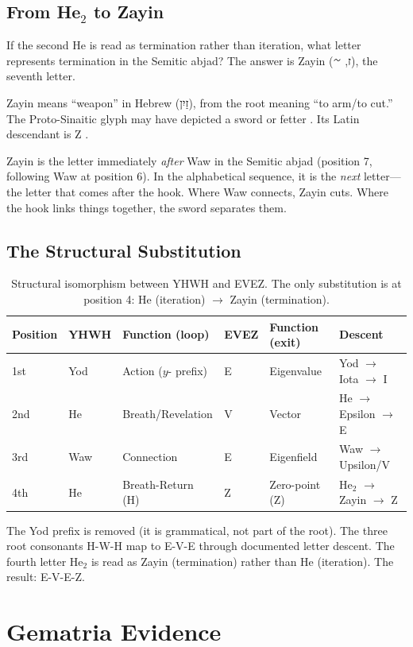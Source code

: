 \documentclass[12pt]{article}
\begin{document}
\subsection{From He$_2$ to Zayin}

If the second He is read as termination rather than iteration, what letter represents termination in the Semitic abjad? The answer is Zayin (ז, 𐤆), the seventh letter.

Zayin means ``weapon'' in Hebrew (זַיִן), from the root meaning ``to arm/to cut.'' The Proto-Sinaitic glyph may have depicted a sword or fetter \cite{cross1980}. Its Latin descendant is Z \cite{jeffery1990}.

Zayin is the letter immediately \textit{after} Waw in the Semitic abjad (position 7, following Waw at position 6). In the alphabetical sequence, it is the \textit{next} letter---the letter that comes after the hook. Where Waw connects, Zayin cuts. Where the hook links things together, the sword separates them.

\subsection{The Structural Substitution}

\begin{table}[h]
\centering
\begin{tabular}{llllll}
\toprule
Position & YHWH & Function (loop) & EVEZ & Function (exit) & Descent \\
\midrule
1st & Yod & Action ($y$- prefix) & E & Eigenvalue & Yod $\to$ Iota $\to$ I \\
2nd & He & Breath/Revelation & V & Vector & He $\to$ Epsilon $\to$ E \\
3rd & Waw & Connection & E & Eigenfield & Waw $\to$ Upsilon/V \\
4th & He & Breath-Return (H) & Z & Zero-point (Z) & He$_2$ $\to$ Zayin $\to$ Z \\
\bottomrule
\end{tabular}
\caption{Structural isomorphism between YHWH and EVEZ. The only substitution is at position 4: He (iteration) $\to$ Zayin (termination).}
\end{table}

The Yod prefix is removed (it is grammatical, not part of the root). The three root consonants H-W-H map to E-V-E through documented letter descent. The fourth letter He$_2$ is read as Zayin (termination) rather than He (iteration). The result: E-V-E-Z.

\section{Gematria Evidence}
\end{document}
